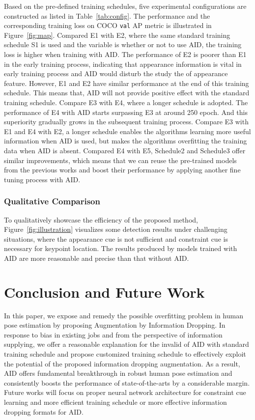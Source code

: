 \documentclass[final]{cvpr}
\begin{document}
Based on the pre-defined training schedules, five experimental configurations are constructed as listed in Table~\ref{tab:config}. The performance and the corresponding training loss on COCO \texttt{val} AP metric is illustrated in Figure~\ref{fig:map}. Compared E1 with E2, where the same standard training schedule S1 is used and the variable is whether or not to use AID, the training loss is higher when training with AID. The performance of E2 is poorer than E1 in the early training process, indicating that appearance information is vital in early training process and AID would disturb the study the of appearance feature. However, E1 and E2 have similar performance at the end of this training schedule. This means that, AID will not provide positive effect with the standard training schedule. Compare E3 with E4, where a longer schedule is adopted. The performance of E4 with AID starts surpassing E3 at around 250 epoch. And this superiority gradually grows in the subsequent training process. Compare E3 with E1 and E4 with E2, a longer schedule enables the algorithms learning more useful information when AID is used, but makes the algorithms overfitting the training data when AID is absent. Compared E4 with E5, Schedule2 and Schedule3 offer similar improvements, which means that we can reuse the pre-trained models from the previous works and boost their performance by applying another fine tuning process with AID.

\subsubsection{Qualitative Comparison}
To qualitatively showcase the efficiency of the proposed method, Figure~\ref{fig:illustration} visualizes some detection results under challenging situations, where the appearance cue is not sufficient and constraint cue is necessary for keypoint location. The results produced by models trained with AID are more reasonable and precise than that without AID.

\section{Conclusion and Future Work}
\label{sec:CC}
In this paper, we expose and remedy the possible overfitting problem in human pose estimation by proposing Augmentation by Information Dropping. In response to bias in existing jobs and from the perspective of information supplying, we offer a reasonable explanation for the invalid of AID with standard training schedule and propose customized training schedule to effectively exploit the potential of the proposed information dropping augmentation. As a result, AID offers fundamental breakthrough in robust human pose estimation and consistently boosts the performance of state-of-the-arts by a considerable margin. Future works will focus on proper neural network architecture for constraint cue learning and more efficient training schedule or more effective information dropping formats for AID.






{\small


}
\end{document}
